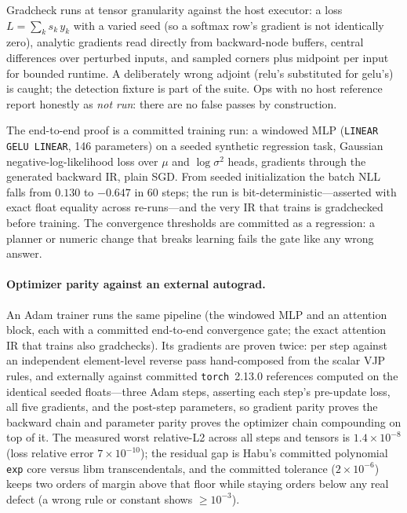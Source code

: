 \documentclass[11pt]{article}
\newcommand{\code}[1]{\texttt{#1}}
\begin{document}
Gradcheck runs at tensor granularity against the host executor: a loss
$L=\sum_k s_k\,y_k$ with a varied seed (so a softmax row's gradient is
not identically zero), analytic gradients read directly from
backward-node buffers, central differences over perturbed inputs, and
sampled corners plus midpoint per input for bounded runtime. A
deliberately wrong adjoint (relu's substituted for gelu's) is caught; the
detection fixture is part of the suite. Ops with no host reference report
honestly as \emph{not run}: there are no false passes by construction.

The end-to-end proof is a committed training run: a windowed MLP
(\code{LINEAR GELU LINEAR}, 146 parameters) on a seeded synthetic
regression task, Gaussian negative-log-likelihood loss over $\mu$ and
$\log\sigma^2$ heads, gradients through the generated backward IR, plain
SGD. From seeded initialization the batch NLL falls from $0.130$ to
$-0.647$ in 60 steps; the run is bit-deterministic---asserted with exact
float equality across re-runs---and the very IR that trains is
gradchecked before training. The convergence thresholds are committed as
a regression: a planner or numeric change that breaks learning fails the
gate like any wrong answer.

\paragraph{Optimizer parity against an external autograd.} An Adam
trainer runs the same pipeline (the windowed MLP and an attention block,
each with a committed end-to-end convergence gate; the exact attention IR
that trains also gradchecks). Its gradients are proven twice: per step
against an independent element-level reverse pass hand-composed from the
scalar VJP rules, and externally against committed \code{torch}~2.13.0
references computed on the identical seeded floats---three Adam steps,
asserting each step's pre-update loss, all five gradients, and the
post-step parameters, so gradient parity proves the backward chain and
parameter parity proves the optimizer chain compounding on top of it. The
measured worst relative-L2 across all steps and tensors is
$1.4\times10^{-8}$ (loss relative error $7\times10^{-10}$); the residual
gap is Habu's committed polynomial \code{exp} core versus libm
transcendentals, and the committed tolerance ($2\times10^{-6}$) keeps two
orders of margin above that floor while staying orders below any real
defect (a wrong rule or constant shows $\ge10^{-3}$).
\end{document}
